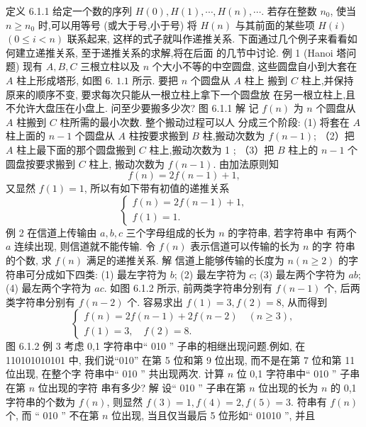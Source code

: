 \documentclass{report}
\begin{document}
	定义 6.1.1 给定一个数的序列 $H(0), H(1), \cdots, H(n), \cdots$. 若存在整数 $n_0$, 使当 $n \geqslant n_0$ 时,可以用等号 (或大于号,小于号) 将 $H(n)$ 与其前面的某些项 $H(i)$ $(0 \leqslant i<n)$ 联系起来, 这样的式子就叫作递推关系.
	下面通过几个例子来看看如何建立递推关系, 至于递推关系的求解,将在后面 的几节中讨论.
	例 1 (Hanoi 塔问题) 现有 $A, B, C$ 三根立柱以及 $n$ 个大小不等的中空圆盘, 这些圆盘自小到大套在 $A$ 柱上形成塔形, 如图 6. $1.1$ 所示. 要把 $n$ 个圆盘从 $A$ 柱上 搬到 $C$ 柱上,并保持原来的顺序不变, 要求每次只能从一根立柱上拿下一个圆盘放 在另一根立柱上,且不允许大盘压在小盘上. 问至少要搬多少次?
	图 6.1.1
	解 记 $f(n)$ 为 $n$ 个圆盘从 $A$ 柱搬到 $C$ 柱所需的最小次数. 整个搬动过程可以人 分成三个阶段:
	(1) 将套在 $A$ 柱上面的 $n-1$ 个圆盘从 $A$ 柱按要求搬到 $B$ 柱,搬动次数为 $f(n-1)$;
	（2）把 $A$ 柱上最下面的那个圆盘搬到 $C$ 柱上,搬动次数为 1 ;
	（3）把 $B$ 柱上的 $n-1$ 个圆盘按要求搬到 $C$ 柱上, 搬动次数为 $f(n-1)$. 由加法原则知
	$$
	f(n)=2 f(n-1)+1,
	$$
	又显然 $f(1)=1$, 所以有如下带有初值的递推关系
	$$
	\left\{\begin{array}{l}
	f(n)=2 f(n-1)+1, \\
	f(1)=1 .
	\end{array}\right.
	$$
	例 2 在信道上传输由 $a, b, c$ 三个字母组成的长为 $n$ 的字符串, 若字符串中 有两个 $a$ 连续出现, 则信道就不能传输. 令 $f(n)$ 表示信道可以传输的长为 $n$ 的字 符串的个数, 求 $f(n)$ 满足的递推关系.
	解 信道上能够传输的长度为 $n(n \geqslant 2)$ 的字符串可分成如下四类:
	(1) 最左字符为 $b$;
	(2) 最左字符为 $c$;
	(3) 最左两个字符为 $a b$;
	(4) 最左两个字符为 $a c$.
	如图 6.1.2 所示, 前两类字符串分别有 $f(n-1)$ 个, 后两类字符串分别有 $f(n-2)$ 个. 容易求出 $f(1)=3, f(2)=8$, 从而得到
	$$
	\left\{\begin{array}{l}
	f(n)=2 f(n-1)+2 f(n-2) \quad(n \geqslant 3), \\
	f(1)=3, \quad f(2)=8 .
	\end{array}\right.
	$$
	图 6.1.2
	例 3 考虑 0,1 字符串中“ 010 ” 子串的相继出现问题.例如, 在 110101010101 中, 我们说“010” 在第 5 位和第 9 位出现, 而不是在第 7 位和第 11 位出现, 在整个字 符串中“ 010 ” 共出现两次. 计算 $n$ 位 0,1 字符串中“ 010 ” 子串在第 $n$ 位出现的字符 串有多少?
	解 设“ 010 ” 子串在第 $n$ 位出现的长为 $n$ 的 0,1 字符串的个数为 $f(n)$, 则显然 $f(3)=1, f(4)=2, f(5)=3$. 符串有 $f(n)$ 个, 而 “ 010 ” 不在第 $n$ 位出现, 当且仅当最后 5 位形如“ 01010 ”, 并且
	
\end{document}
